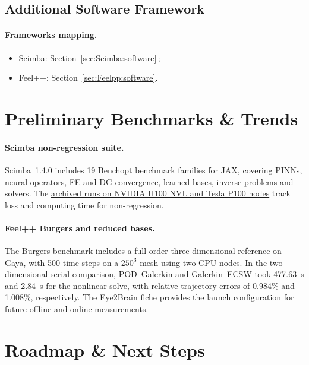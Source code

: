 \subsection{Additional Software Framework}


\paragraph{Frameworks mapping.}
\begin{itemize}
  \item Scimba: Section~\ref{sec:Scimba:software}\,;
  \item Feel++: Section~\ref{sec:Feelpp:software}.
\end{itemize}

\section{Preliminary Benchmarks \& Trends}
\label{sec:wp2:benchmarks}

\paragraph{Scimba non-regression suite.}
Scimba~1.4.0 includes 19 \href{https://benchopt.github.io}{Benchopt}
benchmark families for JAX, covering PINNs, neural operators, FE and DG
convergence, learned bases, inverse problems and solvers. The
\href{https://gitlab.com/scimba/scimba/-/tree/1ab96a32aa3846bb59fa01b1f41cd9372f558a1b/benchmarks/nonregression/results/dev/81f550dd}{archived
runs on NVIDIA H100 NVL and Tesla P100 nodes} track loss and computing
time for non-regression.

\paragraph{Feel++ Burgers and reduced bases.}
The \hyperref[sec:app:specs:app-feelpp-nlcrb]{Burgers benchmark} includes
a full-order three-dimensional reference on Gaya, with 500 time steps
on a $250^3$ mesh using two CPU nodes. In the two-dimensional serial
comparison, POD--Galerkin and Galerkin--ECSW took 477.63~s and 2.84~s
for the nonlinear solve, with relative trajectory errors of 0.984\%
and 1.008\%, respectively. The
\hyperref[sec:app:specs:app-feelpp-rb]{Eye2Brain fiche} provides the
launch configuration for future offline and online measurements.

\section{Roadmap \& Next Steps}



